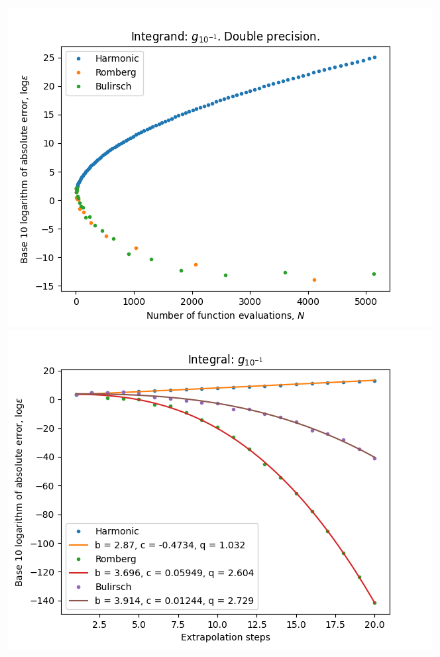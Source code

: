 \begin{figure}[H]
\centering
\begin{minipage}{0.45\textwidth}
\centering
\includegraphics[scale=0.45]{romberg_plots/g_tenth.png}
\end{minipage}
\begin{minipage}{0.45\textwidth}
\centering
\includegraphics[scale=0.45]{romberg_plots/g_tenth_hp_steps.png}
\end{minipage}
\end{figure}

